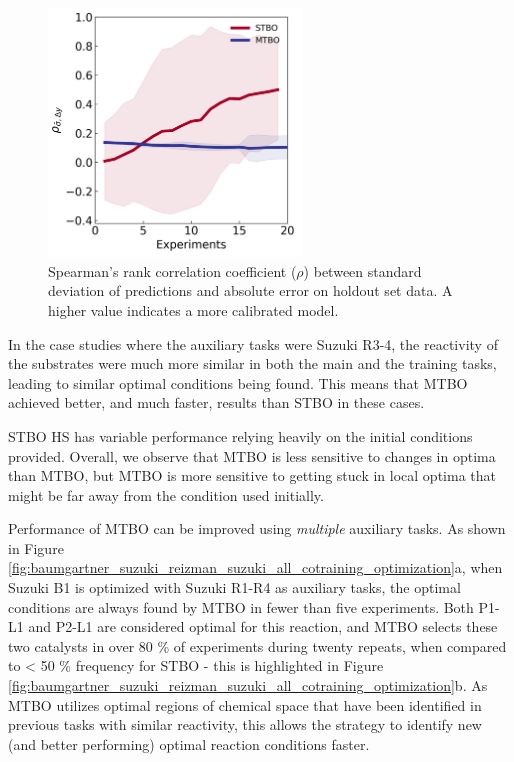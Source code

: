 \begin{figure}
    \centering
    \includegraphics[width=0.6\textwidth]{gfx/Chapter04/baumgartner_suzuki_reizman_suzuki_case_2_optimization_uncertainty.png}
    \caption{Spearman's rank correlation coefficient ($\rho$) between standard deviation of predictions and absolute error on holdout set data. A higher value indicates a more calibrated model.}
    \label{fig:uncertainty_multitask}
\end{figure}


In the case studies where the auxiliary tasks were Suzuki R3-4, the reactivity of the substrates were much more similar in both the main and the training tasks, leading to similar optimal conditions being found. This means that MTBO achieved better, and much faster, results than STBO in these cases. 

STBO HS has variable performance relying heavily on the initial conditions provided. Overall, we observe that MTBO is less sensitive to changes in optima than MTBO, but MTBO is more sensitive to getting stuck in local optima that might be far away from the condition used initially. 

Performance of MTBO can be improved using \textit{multiple} auxiliary tasks. As shown in Figure \ref{fig:baumgartner_suzuki_reizman_suzuki_all_cotraining_optimization}a, when Suzuki B1 is optimized with Suzuki R1-R4 as auxiliary tasks, the optimal conditions are always found by MTBO in fewer than five experiments. Both P1-L1 and P2-L1 are considered optimal for this reaction, and MTBO selects these two catalysts in over 80 \% of experiments during twenty repeats, when compared to \textless{} 50 \% frequency for STBO - this is highlighted in Figure \ref{fig:baumgartner_suzuki_reizman_suzuki_all_cotraining_optimization}b. As MTBO utilizes optimal regions of chemical space that have been identified in previous tasks with similar reactivity, this allows the strategy to identify new (and better performing) optimal reaction conditions faster.

